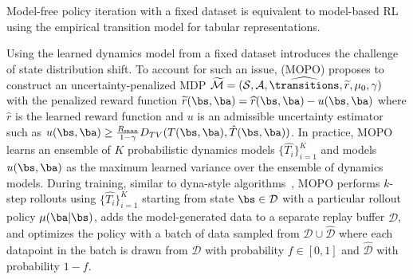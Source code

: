\begin{proposition}
Model-free policy iteration with a fixed dataset is equivalent to model-based RL using the empirical transition model for tabular representations.
\end{proposition}
Using the learned dynamics model from a fixed dataset introduces the challenge of state distribution shift. To account for such an issue, \citet{yu2020mopo} (MOPO)
proposes to construct an uncertainty-penalized MDP $\widetilde{\mathcal{M}} = (\mathcal{S}, \mathcal{A}, \widehat{\transitions}, \widetilde{r}, \mu_0, \gamma)$ with the penalized reward function $\widetilde{r}(\bs, \ba) = \widehat{r}(\bs, \ba) - u(\bs, \ba)$ where $\widehat{r}$ is the learned reward function and $u$ is an admissible uncertainty estimator such as $u(\bs,\ba) \geq \frac{R_{\max}}{1-\gamma} D_{TV}(T(\bs,\ba), \hat{T}(\bs,\ba))$. In practice, MOPO learns an ensemble of $K$ probabilistic dynamics models $\{\widehat{T_i}\}_{i=1}^K$ and models $u(\bs, \ba)$ as the maximum learned variance over the ensemble of dynamics models. During training, similar to dyna-style algorithms~\cite{sutton1991dyna,janner2019trust}, MOPO performs $k$-step rollouts using $\{\widehat{T_i}\}_{i=1}^K$ starting from state $\bs \in \mathcal{D}$ with a particular rollout policy $\mu(\ba|\bs)$, adds the model-generated data to a separate replay buffer $\hat{\mathcal{D}}$, and optimizes the policy with a batch of data sampled from $\mathcal{D} \cup \hat{\mathcal{D}}$ where each datapoint in the batch is drawn from $\mathcal{D}$ with probability $f \in [0, 1]$ and $\hat{\mathcal{D}}$ with probability $1 - f$.